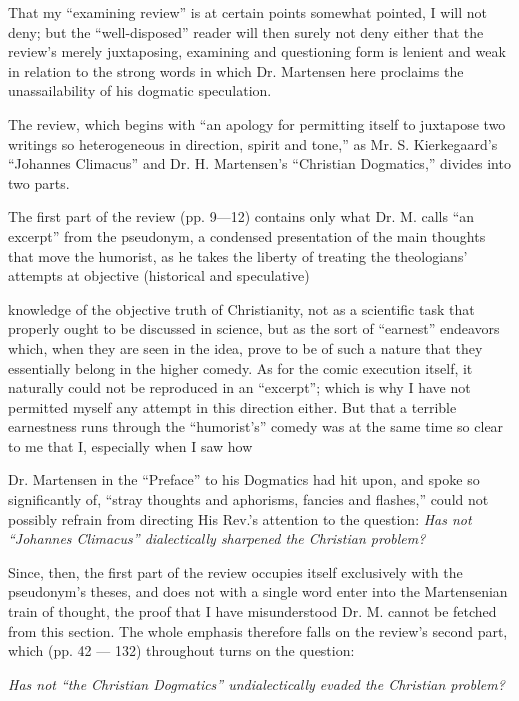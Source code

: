 \documentclass[12pt,a4paper,openany]{book}
\newcommand{\opage}[1]{\marginnote{\footnotesize\textit{[#1]}}}
\begin{document}
That my ``examining review'' is at certain points
somewhat pointed, I will not deny; but the ``well-disposed''
reader will then surely not deny either that the review's merely
juxtaposing, examining and questioning form is lenient
and weak in relation to the strong words in which
Dr. Martensen here proclaims the unassailability of his dogmatic
speculation.

The review, which begins with ``an apology for permitting
itself to juxtapose two writings so heterogeneous in direction,
spirit and tone,'' as Mr. S. Kierkegaard's
``Johannes Climacus'' and Dr. H. Martensen's ``Christian
Dogmatics,'' divides into two parts.

The first part of the review (pp. 9—12) contains only
what Dr. M. calls ``an excerpt'' from the pseudonym, a condensed
presentation of the main thoughts that move the humorist,
as he takes the liberty of treating the theologians'
attempts at objective (historical and speculative)

\setcounter{footnote}{0}%
\opage{47}knowledge of the objective truth of Christianity, not as a
scientific task that properly ought to be discussed in science,
but as the sort of ``earnest'' endeavors which, when
they are seen in the idea, prove to be of such a nature that
they essentially belong in the higher comedy. As for the
comic execution itself, it naturally could not
be reproduced in an ``excerpt''; which is why I have not permitted
myself any attempt in this direction either. But that a
terrible earnestness runs through the ``humorist's'' comedy was
at the same time so clear to me that I, especially when I saw how

Dr. Martensen in the ``Preface'' to his Dogmatics had hit
upon, and spoke so significantly of, ``stray thoughts
and aphorisms, fancies and flashes,'' could not possibly
refrain from directing His Rev.'s attention to the
question: \emph{Has not ``Johannes Climacus'' dialectically
sharpened the Christian problem?}

Since, then, the first part of the review occupies itself
exclusively with the pseudonym's theses, and does not with a
single word enter into the Martensenian train of thought, the
proof that I have misunderstood Dr. M. cannot be fetched from
this section. The whole emphasis therefore falls on the review's
second part, which (pp. 42 --- 132) throughout turns
on the question:

\emph{Has not ``the Christian Dogmatics'' undialectically
evaded the Christian problem?}
\end{document}

